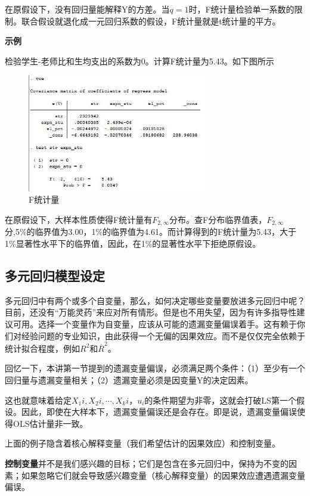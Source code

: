 \documentclass[cn,10pt,math=newtx,citestyle=gb7714-2015,bibstyle=gb7714-2015]{elegantbook}
\begin{document}
	在原假设下，没有回归量能解释Y的方差。当$q=1$时，F统计量检验单一系数的限制。联合假设就退化成一元回归系数的假设，F统计量就是t统计量的平方。
	
	\textbf{示例}
	
	检验学生-老师比和生均支出的系数为0。计算F统计量为5.43。如下图所示
	\begin{figure}[htbp]
		\centering
		\includegraphics[width=0.7\textwidth]{F2.jpg}
		\caption{F统计量}\label{fig:digit}
	\end{figure}
	
	在原假设下，大样本性质使得F统计量有$F_{2,\infty}$分布。查F分布临界值表，$F_{2,\infty}$分,5\%的临界值为3.00，1\%的临界值为4.61。而计算得到的F统计量为5.43，大于1\%显著性水平下的临界值，因此，在1\%的显著性水平下拒绝原假设。
	
	\subsection{多元回归模型设定}
	多元回归中有两个或多个自变量，那么，如何决定哪些变量要放进多元回归中呢？目前，还没有“万能灵药”来应对所有情形。但是也不用失望，因为有许多指导性建议可用。选择一个变量作为自变量，应该从可能的遗漏变量偏误着手。这有赖于你们对经验问题的专业知识，由此获得一个无偏的因果效应。而不是仅仅完全依赖于统计拟合程度，例如$R^2$和$\overline{R}^2$。
	
	回忆一下，本讲第一节提到的遗漏变量偏误，必须满足两个条件：（1）至少有一个回归量与遗漏变量相关；（2）遗漏变量必须是因变量Y的决定因素。
	
	这也就意味着给定$X_1i,X_2i,\cdots,X_ki$，$u_i$的条件期望为非零，这就会打破LS第一个假设。因此，即使在大样本下，遗漏变量偏误还是会存在。即是说，遗漏变量偏误使得OLS估计量非一致。
	
	上面的例子隐含着核心解释变量（我们希望估计的因果效应）和控制变量。
	
	\textbf{控制变量}并不是我们感兴趣的目标；它们是包含在多元回归中，保持为不变的因素；如果忽略它们就会导致感兴趣变量（核心解释变量）的因果效应遭遇遗漏变量偏误。
	
\end{document}
